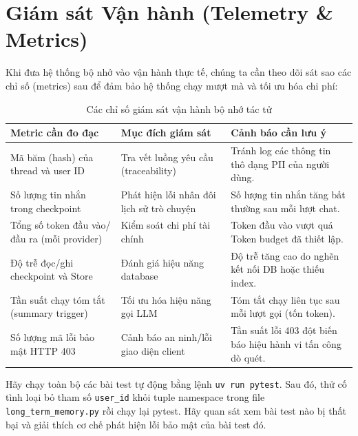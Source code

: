 \section{Giám sát Vận hành (Telemetry \& Metrics)}

Khi đưa hệ thống bộ nhớ vào vận hành thực tế, chúng ta cần theo dõi sát sao các chỉ số (metrics) sau để đảm bảo hệ thống chạy mượt mà và tối ưu hóa chi phí:

\begin{table}[H]
\centering
\caption{Các chỉ số giám sát vận hành bộ nhớ tác tử}
\begin{tabular}{p{5.8cm}p{4.0cm}p{4.8cm}}
\toprule
\textbf{Metric cần đo đạc} & \textbf{Mục đích giám sát} & \textbf{Cảnh báo cần lưu ý} \\
\midrule
Mã băm (hash) của thread và user ID & Tra vết luồng yêu cầu (traceability) & Tránh log các thông tin thô dạng PII của người dùng. \\
Số lượng tin nhắn trong checkpoint & Phát hiện lỗi nhân đôi lịch sử trò chuyện & Số lượng tin nhắn tăng bất thường sau mỗi lượt chat. \\
Tổng số token đầu vào/đầu ra (mỗi provider) & Kiểm soát chi phí tài chính & Token đầu vào vượt quá Token budget đã thiết lập. \\
Độ trễ đọc/ghi checkpoint và Store & Đánh giá hiệu năng database & Độ trễ tăng cao do nghẽn kết nối DB hoặc thiếu index. \\
Tần suất chạy tóm tắt (summary trigger) & Tối ưu hóa hiệu năng gọi LLM & Tóm tắt chạy liên tục sau mỗi lượt gọi (tốn token). \\
Số lượng mã lỗi bảo mật HTTP 403 & Cảnh báo an ninh/lỗi giao diện client & Tần suất lỗi 403 đột biến báo hiệu hành vi tấn công dò quét. \\
\bottomrule
\end{tabular}
\end{table}

\begin{aicheckpoint}
Hãy chạy toàn bộ các bài test tự động bằng lệnh \texttt{uv run pytest}. Sau đó, thử cố tình loại bỏ tham số \texttt{user\_id} khỏi tuple namespace trong file \texttt{long\_term\_memory.py} rồi chạy lại pytest. Hãy quan sát xem bài test nào bị thất bại và giải thích cơ chế phát hiện lỗi bảo mật của bài test đó.
\end{aicheckpoint}
